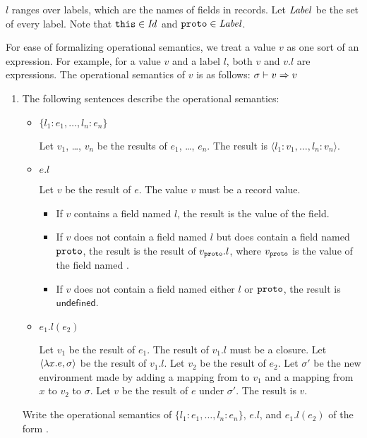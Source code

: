 \begin{enumerate}
$l$ ranges over labels, which are the names of fields in records.
Let $\mbox{\emph{Label}}$ be the set of every label.
Note that $\texttt{this}\in\mbox{\emph{Id}}$ and $\texttt{proto}\in\mbox{\emph{Label}}$.

For ease of formalizing operational semantics, we treat a value $v$ as one sort
of an expression. For example, for a value $v$ and a label $l$, both $v$ and
$v.l$ are expressions.
The operational semantics of $v$ is as follows: $\sigma\vdash v\Rightarrow v$

\begin{enumerate}
  \item
    The following sentences describe the operational semantics:
    \begin{itemize}
      \item $\{l_1:e_1,\ldots,l_n:e_n\}$

        Let $v_1$, \ldots, $v_n$ be the results of $e_1$, \ldots, $e_n$.
        The result is $\langle l_1:v_1,\ldots,l_n:v_n\rangle$.

      \item $e.l$

        Let $v$ be the result of $e$. The value $v$ must be a record value.
        \begin{itemize}
          \item If $v$ contains a field named $l$, the result is the value of the
            field.
          \item If $v$ does not contain a field named $l$ but does contain a field
            named $\texttt{proto}$,
            the result is the result of $v_{\texttt{proto}}.l$, where
            $v_{\texttt{proto}}$ is the value of the field named .
          \item
            If $v$ does not contain a field named either $l$ or $\texttt{proto}$,
            the result is $\textsf{undefined}$.
        \end{itemize}

      \item $e_1.l(e_2)$

        Let $v_1$ be the result of $e_1$.  The result of $v_1.l$ must be a
        closure. Let $\langle\lambda x.e,\sigma\rangle$ be the result of $v_1.l$.  Let $v_2$
        be the result of $e_2$.  Let $\sigma'$ be the new environment made by
        adding a mapping from  to $v_1$ and a mapping from $x$ to
        $v_2$ to $\sigma$.  Let $v$ be the result of $e$ under $\sigma'$.  The
        result is $v$.

    \end{itemize}
    Write the operational semantics of $\{l_1:e_1,\ldots,l_n:e_n\}$, $e.l$, and
    $e_1.l(e_2)$ of the form .


\end{enumerate}
\end{enumerate}
